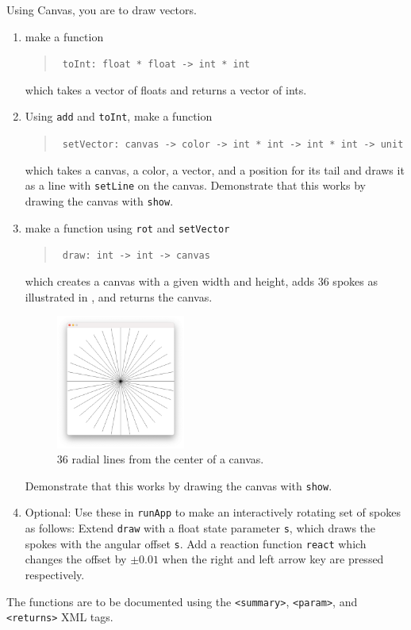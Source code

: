 Using Canvas, you are to draw vectors.
\begin{enumerate}
\item make a function
  \begin{quote}
    \mbox{\lstinline! toInt: float * float -> int * int!}
  \end{quote}
  which takes a vector of floats and returns a vector of ints.
\item Using \lstinline{add} and \lstinline{toInt}, make a function
  \begin{quote}
    \mbox{\lstinline! setVector: canvas -> color -> int * int -> int * int -> unit!}
  \end{quote}
  which takes a canvas, a color, a vector, and a position for its tail and draws it as a line with \lstinline{setLine} on the canvas. Demonstrate that this works by drawing the canvas with \lstinline{show}.
\item make a function using \lstinline{rot} and \lstinline{setVector}
  \begin{quote}
    \mbox{\lstinline! draw: int -> int -> canvas!}
  \end{quote}
  which creates a canvas with a given width and height, adds 36 spokes as illustrated in , and returns the canvas.
  \begin{figure}
    \centering
    \includegraphics[width=0.4\textwidth]{spokes}
    \caption{36 radial lines from the center of a canvas.}
    \label{fig:spokes}
  \end{figure}
  Demonstrate that this works by drawing the canvas with \lstinline{show}.
\item Optional: Use these in \lstinline{runApp} to make an interactively rotating set of spokes as follows: Extend \lstinline{draw} with a float state parameter \lstinline{s}, which draws the spokes with the angular offset \lstinline{s}. Add a reaction function \lstinline{react} which changes the offset by $\pm0.01$ when the right and left arrow key are pressed respectively.
\end{enumerate}
The functions are to be documented using the \verb|<summary>|, \verb|<param>|, and \verb|<returns>| XML tags.
